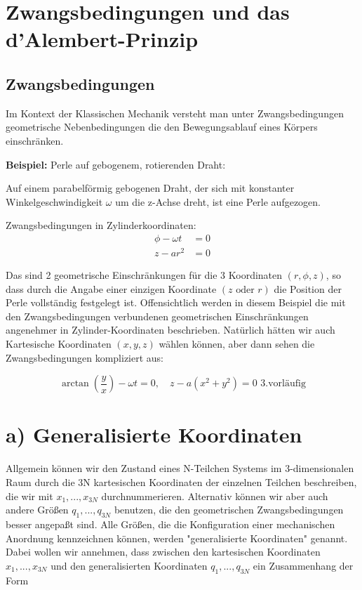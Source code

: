 \documentclass[10pt, letterpaper]{article}
\begin{document}
\section{Zwangsbedingungen und das d'Alembert-Prinzip}

\subsection{Zwangsbedingungen}

Im Kontext der Klassischen Mechanik versteht man unter Zwangsbedingungen geometrische Nebenbedingungen die den Bewegungsablauf eines Körpers einschränken.

\textbf{Beispiel:} Perle auf gebogenem, rotierenden Draht:

Auf einem parabelförmig gebogenen Draht, der sich mit konstanter Winkelgeschwindigkeit $\omega$ um die z-Achse dreht, ist eine Perle aufgezogen.

Zwangsbedingungen in Zylinderkoordinaten:
\begin{align*}
\phi - \omega t &= 0 \\
z - a r^2 &= 0
\end{align*}

Das sind 2 geometrische Einschränkungen für die 3 Koordinaten $(r,\phi,z)$, so dass durch die Angabe einer einzigen Koordinate $(z \text{ oder } r)$ die Position der Perle vollständig festgelegt ist.
Offensichtlich werden in diesem Beispiel die mit den Zwangsbedingungen verbundenen geometrischen Einschränkungen angenehmer in Zylinder-Koordinaten beschrieben. Natürlich hätten wir auch Kartesische Koordinaten $(x,y,z)$ wählen können, aber dann sehen die Zwangsbedingungen kompliziert aus:

\[
\arctan(\frac{y}{x})-\omega t = 0, \quad z-a(x^2+y^2) = 0 \text{ 3.vorläufig}\]
\section*{a) Generalisierte Koordinaten}


Allgemein können wir den Zustand eines N-Teilchen Systems im 3-dimensionalen Raum durch die 3N kartesischen Koordinaten der einzelnen Teilchen beschreiben, die wir mit $x_1,...,x_{3N}$ durchnummerieren. Alternativ können wir aber auch andere Größen $q_1,...,q_{3N}$ benutzen, die den geometrischen Zwangsbedingungen besser angepaßt sind. Alle Größen, die die Konfiguration einer mechanischen Anordnung kennzeichnen können, werden "generalisierte Koordinaten" genannt. Dabei wollen wir annehmen, dass zwischen den kartesischen Koordinaten $x_1,...,x_{3N}$ und den generalisierten Koordinaten $q_1,...,q_{3N}$ ein Zusammenhang der Form
\end{document}
